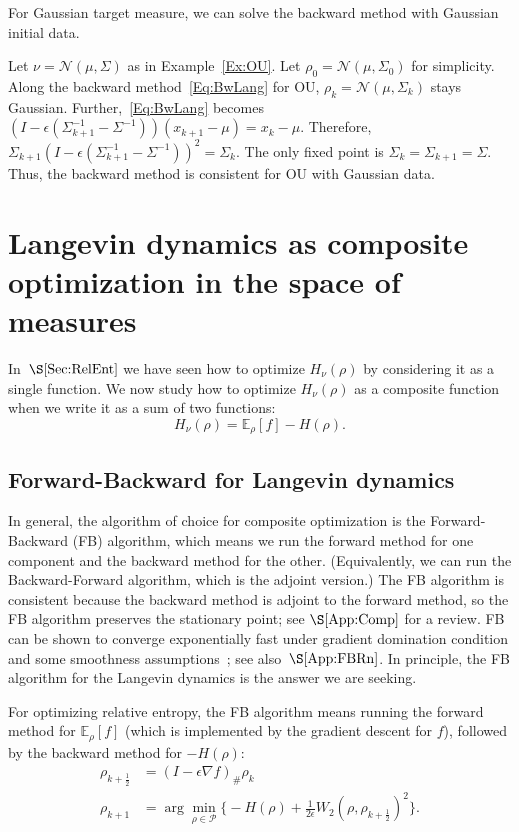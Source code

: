 \documentclass[final,12pt]{colt2018}
\newcommand{\E}{\mathbb{E}}
\newcommand{\N}{\mathcal{N}}
\renewcommand{\P}{\mathcal{P}}
\begin{document}
For Gaussian target measure, we can solve the backward method with Gaussian initial data.

\begin{example}
\label{Ex:OUB}
Let $\nu = \N(\mu,\Sigma)$ as in Example~\ref{Ex:OU}.
Let $\rho_0 = \N(\mu,\Sigma_0)$ for simplicity.
Along the backward method~\eqref{Eq:BwLang} for OU, $\rho_k = \N(\mu,\Sigma_k)$ stays Gaussian.
Further,~\eqref{Eq:BwLang} becomes
$(I - \epsilon (\Sigma_{k+1}^{-1}-\Sigma^{-1})) (x_{k+1}-\mu) = x_k-\mu$.
Therefore, $\Sigma_{k+1}(I-\epsilon(\Sigma_{k+1}^{-1}-\Sigma^{-1}))^2 = \Sigma_k$.
The only fixed point is $\Sigma_k = \Sigma_{k+1} = \Sigma$.
Thus, the backward method is consistent for OU with Gaussian data.
\end{example}


\section{Langevin dynamics as composite optimization in the space of measures}
\label{Sec:Comp}

In~$\S\ref{Sec:RelEnt}$ we have seen how to optimize $H_\nu(\rho)$ by considering it as a single function.
We now study how to optimize $H_\nu(\rho)$ as a composite function when we write it as a sum of two functions:
$$H_\nu(\rho) = \E_\rho[f] - H(\rho).$$



\subsection{Forward-Backward for Langevin dynamics}
\label{Sec:FBLang}

In general, the algorithm of choice for composite optimization is the Forward-Backward (FB) algorithm, which means we run the forward method for one component and the backward method for the other.
(Equivalently, we can run the Backward-Forward algorithm, which is the adjoint version.)
The FB algorithm is consistent because the backward method is adjoint to the forward method, so the FB algorithm preserves the stationary point; see $\S\ref{App:Comp}$ for a review.
FB can be shown to converge exponentially fast under gradient domination condition and some smoothness assumptions~\cite[]{GRV17}; see also~$\S\ref{App:FBRn}$.
In principle, the FB algorithm for the Langevin dynamics is the answer we are seeking.


For optimizing relative entropy, the FB algorithm means running the forward method for $\E_\rho[f]$ (which is implemented by the gradient descent for $f$), followed by the backward method for $-H(\rho)$:
\vspace{-10pt}
\begin{subequations}\label{Eq:FBLang}
\begin{align}
\rho_{k+\frac{1}{2}} &= (I - \epsilon \nabla f)_\# \rho_k \label{Eq:FBLanga} \\
\rho_{k+1} &= \arg\min_{\rho \in \P} \Big\{ -H(\rho) + \frac{1}{2\epsilon} W_2(\rho,\rho_{k+\frac{1}{2}})^2\Big\}. \label{Eq:FBLangb}
\end{align}
\end{subequations}
\end{document}

